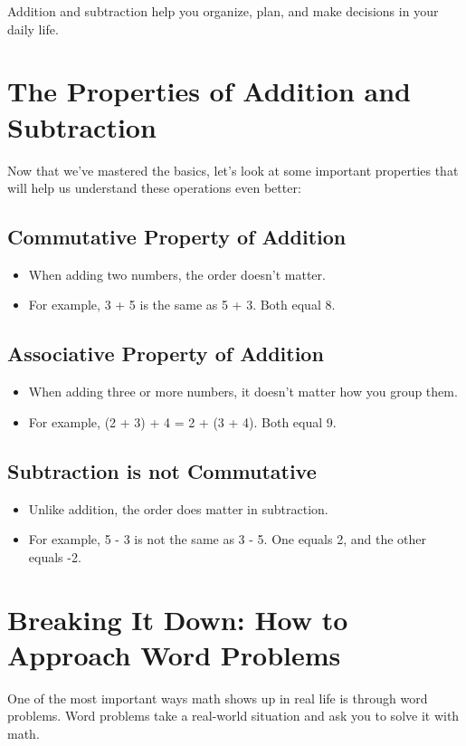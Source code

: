 Addition and subtraction help you organize, plan, and make decisions in your daily life.

\section{The Properties of Addition and Subtraction}
Now that we’ve mastered the basics, let’s look at some important properties that will help us understand these operations even better:

\subsection{Commutative Property of Addition}
\begin{itemize}
    \item When adding two numbers, the order doesn’t matter.
    \item For example, 3 + 5 is the same as 5 + 3. Both equal 8.
\end{itemize}

\subsection{Associative Property of Addition}
\begin{itemize}
    \item When adding three or more numbers, it doesn’t matter how you group them.
    \item For example, (2 + 3) + 4 = 2 + (3 + 4). Both equal 9.
\end{itemize}

\subsection{Subtraction is not Commutative}
\begin{itemize}
    \item Unlike addition, the order does matter in subtraction.
    \item For example, 5 - 3 is not the same as 3 - 5. One equals 2, and the other equals -2.
\end{itemize}

\section{Breaking It Down: How to Approach Word Problems}
One of the most important ways math shows up in real life is through word problems. Word problems take a real-world situation and ask you to solve it with math.

